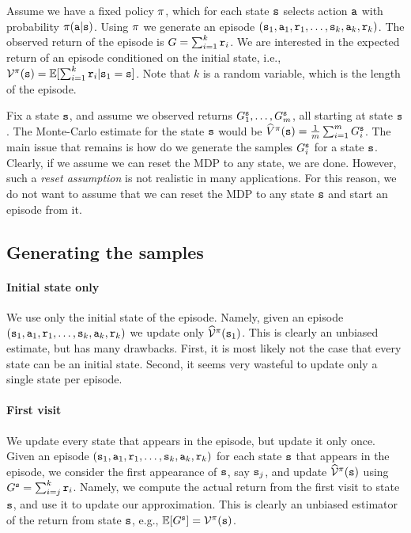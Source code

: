 Assume we have a fixed policy $\pi$, which for each state
${\tt s}$ selects action ${\tt a}$ with probability
$\pi({\tt a}|{\tt s})$. Using $\pi$ we generate an episode
$({\tt s}_1, {\tt a}_1, {\tt r}_1, \ldots ,
{\tt s}_k,{\tt a}_k,{\tt r}_k)$. The observed return of the episode
is $G=\sum_{i=1}^k {\tt r}_i$. We are interested in the expected
return of an episode conditioned on the initial state, i.e.,
$\mathcal{V}^\pi({\tt s})=\mathbb{E}[\sum_{i=1}^k {\tt r}_i |{\tt s}_1={\tt s}]$.
Note that $k$ is a random variable, which is the length of the
episode.

Fix a state ${\tt s}$, and assume we observed returns $G^{\tt s}_1,
\ldots , G^{\tt s}_m$, all starting at state ${\tt s}$. The
Monte-Carlo estimate for the state ${\tt s}$ would be
$\widehat{V}^\pi({\tt s})=\frac{1}{m}\sum_{i=1}^m G_i^{\tt s}$. The main
issue that remains is how do we generate the samples $G^{\tt s}_i$
for a state ${\tt s}$. Clearly, if we assume we can reset the MDP to
any state, we are done. However, such a \emph{reset assumption} is
not realistic in many applications. For this reason, we do not want
to assume that we can reset the MDP to any state ${\tt s}$ and start
an episode from it.

\subsection{Generating the samples}

\paragraph{Initial state only}
We use only the initial state of the episode. Namely, given an
episode $({\tt s}_1, {\tt a}_1, {\tt r}_1, \ldots ,
{\tt s}_k,{\tt a}_k,{\tt r}_k)$ we update only
$\widehat{\mathcal{V}}^\pi({\tt s}_1)$. This is clearly an unbiased
estimate, but has many drawbacks. First, it is most likely not the
case that every state can be an initial state. Second, it seems very wasteful to update only a single
state per episode.

\paragraph{First visit}
We update every state that appears in the episode, but update it
only once. Given an episode $({\tt s}_1, {\tt a}_1, {\tt r}_1, \ldots
, {\tt s}_k,{\tt a}_k,{\tt r}_k)$ for each state ${\tt s}$ that appears
in the episode, we consider the first appearance of ${\tt s}$, say
${\tt s}_j$, and update $\widehat{\mathcal{V}}^\pi({\tt s})$ using
$G^{\tt s}=\sum_{i=j}^k {\tt r}_i$. Namely, we compute the actual
return from the first visit to state ${\tt s}$, and use it to update
our approximation. This is clearly an unbiased estimator of the
return from state ${\tt s}$, e.g.,
$\mathbb{E}[G^{\tt s}]=\mathcal{V}^\pi({\tt s})$.

